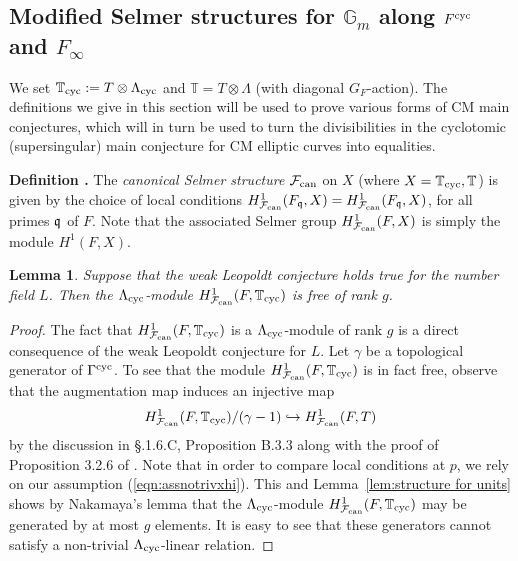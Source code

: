 \documentclass[12pt]{amsart}
\numberwithin{equation}{section}
\newtheorem{lemma}[thm]{Lemma}
\newenvironment{define}{\par\medskip\noindent\refstepcounter{thm}
\bgroup{\hspace*{-0.15 cm}\bf{Definition}
\thethm.}\bgroup}{\egroup \egroup\par\medskip}
\begin{document}
\subsection{Modified Selmer structures for $\mathbb{G}_m$ along $F^{\textup{cyc}}$ and $F_\infty$}
\label{subsec:modifiedselmerG_mcyclo}
We set ${\mathbb{T}}_{\textup{cyc}}:=T\otimes\Lambda_{\textup{cyc}}$ and ${\mathbb{T}}=T\otimes{\Lambda}$ (with diagonal $G_F$-action). The definitions we give in this section will be used to prove various forms of CM main conjectures, which will in turn be used to turn the divisibilities in the cyclotomic (supersingular) main conjecture for CM elliptic curves into equalities.
\begin{define}
\label{def:selmerstructurecyclotomic}
The \emph{canonical Selmer structure} ${\mathcal{F}_{\textup{\lowercase{can}}}}$ on $X$ (where $X={\mathbb{T}}_{\textup{cyc}}, {\mathbb{T}}$) is given by the choice of local conditions $H^1_{\mathcal{F}_{\textup{\lowercase{can}}}}(F_\frak{q},X)=H^1_{\mathcal{F}_{\textup{\lowercase{can}}}}(F_\frak{q},X)$, 
for all primes $\frak{q}$ of $F$. Note that the associated Selmer group $H^1_{\mathcal{F}_{\textup{\lowercase{can}}}}(F,X)$ is simply the module $H^1(F,X)$.
\end{define}
\begin{lemma}
\label{lemma:H1facalongcyclotower}
Suppose that the weak Leopoldt conjecture holds true for the number field $L$. Then the ${\Lambda}_{\textup{cyc}}$-module $H^1_{\mathcal{F}_{\textup{\lowercase{can}}}}(F,{\mathbb{T}}_{\textup{cyc}})$ is free of rank $g$.
\end{lemma}
\begin{proof}
The fact that $H^1_{\mathcal{F}_{\textup{\lowercase{can}}}}(F,{\mathbb{T}}_{\textup{cyc}})$ is a ${\Lambda}_{\textup{cyc}}$-module of rank $g$ is a direct consequence of the weak Leopoldt conjecture for $L$. Let $\gamma$ be a topological generator of $\Gamma^{\textup{cyc}}$. To see that the module $H^1_{\mathcal{F}_{\textup{\lowercase{can}}}}(F,{\mathbb{T}}_{\textup{cyc}})$ is in fact free, observe that the augmentation map induces an injective map
$$H^1_{\mathcal{F}_{\textup{\lowercase{can}}}}(F,{\mathbb{T}}_{\textup{cyc}})/(\gamma-1) \hookrightarrow H^1_{\mathcal{F}_{\textup{\lowercase{can}}}}(F,T)$$
by the discussion in \S.1.6.C, Proposition B.3.3 along with the proof of Proposition 3.2.6 of \cite{r00}. Note that in order to compare local conditions at $p$, we rely on our assumption (\ref{eqn:assnotrivxhi}). This and Lemma~\ref{lem:structure for units} shows by Nakamaya's lemma that the ${\Lambda}_{\textup{cyc}}$-module $H^1_{\mathcal{F}_{\textup{\lowercase{can}}}}(F,{\mathbb{T}}_{\textup{cyc}})$ may be generated by at most $g$ elements. It is easy to see that these generators cannot satisfy a non-trivial ${\Lambda}_{\textup{cyc}}$-linear relation.
\end{proof}
\end{document}
